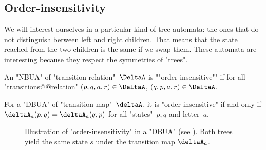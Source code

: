 \documentclass[a4paper,UKenglish,cleveref, autoref, thm-restate]{lipics-v2021}
\begin{document}
\subsection{Order-insensitivity}\label{sec:OrderAutomata}

We will interest ourselves in a particular kind of tree automata: the ones that do not distinguish between left and right children.
That means that the state reached from the two children is the same if we swap them. These automata are
interesting because they respect the symmetries of "trees".

\begin{definition}
	\AP An "NBUA" of "transition relation"~$\DeltaA$ is ""order-insensitive"" if for all "transitions@@relation" $(p,q,a,r) \in \DeltaA$,
	$(q,p,a,r) \in \DeltaA$.
\end{definition}

\begin{remark}\label{def:order-insensitive}
	For a "DBUA" of "transition map"~$\deltaA$, it is "order-insensitive" if and only if
	$\deltaA_a (p,q) = \deltaA_a (q,p)$ for all "states"~$p,q$ and letter~$a$.
\end{remark}


\begin{figure}[h]
	\centering
	\caption{Illustration of "order-insensitivity" in a "DBUA" (see ).
		Both trees yield the same state $s$ under the transition map $\deltaA_a$.}
	\label{fig:order-insensitivity}
\end{figure}
\end{document}
